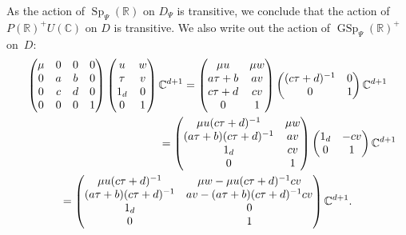 \documentclass[JEP,XML,SOM,Unicode,NoFloatCountersInSection]{cedram}
\theoremstyle{plain}
\theoremstyle{definition}
\numberwithin{equation}{subsection}
\renewcommand{\C}{\mathbb C}
\newcommand{\R}{\mathbb R}
\DeclareMathOperator{\GSp}{GSp}
\DeclareMathOperator{\Sp}{Sp}
\begin{document}
As the action of $\Sp_\Psi(\R)$ on $D_\Psi$ is transitive, we conclude
that the action of $P(\R)^+U(\C)$ on $D$ is transitive. We also write
out the action of $\GSp_\Psi(\R)^+$ on~$D$:
\begin{multline}\label{eq:GSp-action}
\begin{pmatrix}
\mu & 0 & 0 & 0\\
0 & a & b & 0\\
0 & c & d & 0\\
0 & 0 & 0 & 1
\end{pmatrix}
\begin{pmatrix}
u & w\\ \tau & v \\ 1_d & 0\\ 0 & 1
\end{pmatrix}
\C^{d+1} =
\begin{pmatrix}
\mu u & \mu w\\ a\tau +b & av \\ c\tau+ d & cv\\ 0 & 1
\end{pmatrix}
\begin{pmatrix}
(c\tau+d)^{-1} & 0 \\ 0 & 1
\end{pmatrix}
\C^{d+1}\\
\hspace*{4.5cm}=
\begin{pmatrix}
\mu u (c\tau+d)^{-1} & \mu w\\ (a\tau +b) (c\tau+d)^{-1} & av \\ 1_d & cv\\ 0 & 1
\end{pmatrix}
\begin{pmatrix}
1_d & -cv \\0 & 1
\end{pmatrix}
\C^{d+1}\\ =
\begin{pmatrix}
\mu u (c\tau+d)^{-1} & \mu w-\mu u (c\tau+d)^{-1}cv\\
(a\tau +b) (c\tau+d)^{-1} & av -(a\tau +b) (c\tau+d)^{-1} cv\\ 1_d & 0\\ 0 & 1
\end{pmatrix} \C^{d+1}.
\end{multline}
\end{document}
